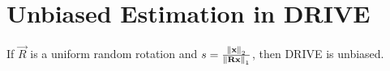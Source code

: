 \documentclass[twoside]{article}
\begin{document}



\section{Unbiased Estimation in DRIVE}

\begin{claim}
    If \(\vec{R}\) is a uniform random rotation and \(s = \frac{\left\lVert\boldsymbol{\mathbf{x}}\right\rVert_2}{\left\lVert\boldsymbol{\mathbf{Rx}}\right\rVert_1}\), then DRIVE is unbiased.
\end{claim}
\end{document}
